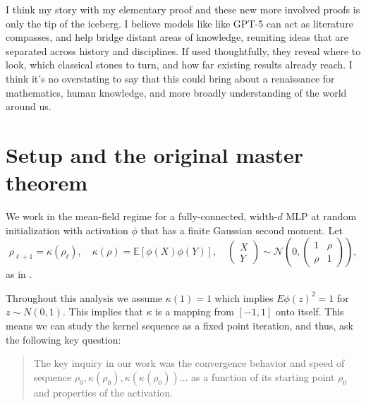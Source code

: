 \documentclass[11pt]{article}
\begin{document}
I think my story with my elementary proof and these new more involved proofs is only the tip of the iceberg. I believe models like like GPT-5 can act as literature compasses, and help bridge distant areas of knowledge, reuniting ideas that are separated across history and disciplines. If used thoughtfully, they reveal where to look, which classical stones to turn, and how far existing results already reach. I think it's no overstating to say that this could bring about a renaissance for mathematics, human knowledge, and more broadly understanding of the world around us.

\section{Setup and the original master theorem}

We work in the mean-field regime for a fully-connected, width-$d$ MLP at random initialization with activation $\phi$ that has a finite Gaussian second moment. Let
\begin{equation}
\rho_{\ell+1} = \kappa(\rho_\ell), \quad
\kappa(\rho) = \mathbb{E}[\phi(X)\phi(Y)], \quad
\begin{pmatrix}X\\Y\end{pmatrix}
\sim \mathcal{N}\left(0,\begin{pmatrix}1&\rho\\ \rho&1\end{pmatrix}\right),
\end{equation}
as in \cite{poole2016exponential}. 

Throughout this analysis we assume $\kappa(1) = 1$ which implies $E\phi(z)^2 = 1$ for $z\sim N(0,1)$. This implies that $\kappa$ is a mapping from $[-1,1]$ onto itself. This means we can study the kernel sequence as a fixed point iteration, and thus, ask the following key question:

\begin{quote}
{The key inquiry} in our work was the convergence behavior and speed of sequence $\rho_0, \kappa(\rho_0),\kappa(\kappa(\rho_0)) \ldots $ as a function of its starting point $\rho_0$ and properties of the activation.
\end{quote}
\end{document}
